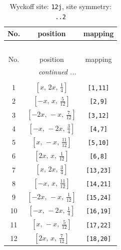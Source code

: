 \documentclass[fleqn,8pt]{jsarticle}
\begin{document}
\begin{longtable}{ccc}
\caption{Wyckoff site: {\tt 12j}, site symmetry: {\tt ..2}}
 \\
 \hline \hline
No. & position & mapping \\ \hline \endfirsthead

\multicolumn{2}{l}{\tablename\ \thetable{}} \\
 \hline \hline
No. & position & mapping \\ \hline \endhead

 \hline \hline
\multicolumn{2}{r}{\footnotesize\it continued ...} \\ \endfoot

 \hline \hline
\multicolumn{2}{r}{} \\ \endlastfoot

1 & $\left[ x,\, 2 x,\, \frac{1}{4} \right]$ & {\tt [1,11]} \\ \hline
2 & $\left[ - x,\, x,\, \frac{5}{12} \right]$ & {\tt [2,9]} \\ \hline
3 & $\left[ - 2 x,\, - x,\, \frac{7}{12} \right]$ & {\tt [3,12]} \\ \hline
4 & $\left[ - x,\, - 2 x,\, \frac{3}{4} \right]$ & {\tt [4,7]} \\ \hline
5 & $\left[ x,\, - x,\, \frac{11}{12} \right]$ & {\tt [5,10]} \\ \hline
6 & $\left[ 2 x,\, x,\, \frac{1}{12} \right]$ & {\tt [6,8]} \\ \hline
7 & $\left[ x,\, 2 x,\, \frac{3}{4} \right]$ & {\tt [13,23]} \\ \hline
8 & $\left[ - x,\, x,\, \frac{11}{12} \right]$ & {\tt [14,21]} \\ \hline
9 & $\left[ - 2 x,\, - x,\, \frac{1}{12} \right]$ & {\tt [15,24]} \\ \hline
10 & $\left[ - x,\, - 2 x,\, \frac{1}{4} \right]$ & {\tt [16,19]} \\ \hline
11 & $\left[ x,\, - x,\, \frac{5}{12} \right]$ & {\tt [17,22]} \\ \hline
12 & $\left[ 2 x,\, x,\, \frac{7}{12} \right]$ & {\tt [18,20]} \\
\end{longtable}
\renewcommand{\arraystretch}{1.2}
\end{document}
